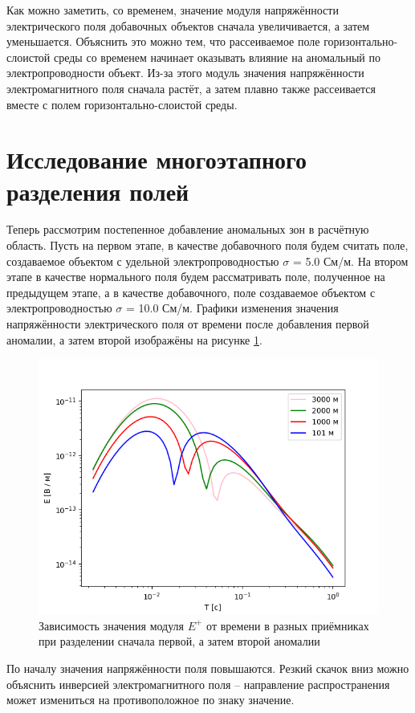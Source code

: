 Как можно заметить, со временем, значение модуля напряжённости электрического поля добавочных объектов сначала увеличивается, а затем уменьшается. Объяснить это можно тем, что рассеиваемое поле горизонтально-слоистой среды со временем начинает оказывать влияние на аномальный по электропроводности объект. Из-за этого модуль значения напряжённости электромагнитного поля сначала растёт, а затем плавно также рассеивается вместе с полем горизонтально-слоистой среды.

\section{Исследование многоэтапного разделения полей}

Теперь рассмотрим постепенное добавление аномальных зон в расчётную область. Пусть на первом этапе, в качестве добавочного поля будем считать поле, создаваемое объектом с удельной электропроводностью $\sigma$ = 5.0 См/м. На втором этапе в качестве нормального поля будем рассматривать поле, полученное на предыдущем этапе, а в качестве добавочного, поле создаваемое объектом с электропроводностью $\sigma$ = 10.0 См/м. Графики изменения значения напряжённости электрического поля от времени после добавления первой аномалии, а затем второй изображёны на рисунке \ref{fig:LogE_1_plus_2}.

\begin{figure}
	\centering
	\vspace*{0.7cm}
	\includegraphics[width=0.75\linewidth]{images/Log_E_1_plus_2.png}
	\caption{Зависимость значения модуля $E^+$ от времени в разных приёмниках при разделении сначала первой, а затем второй аномалии}
	\label{fig:LogE_1_plus_2}
\end{figure} 


По началу значения напряжённости поля повышаются. Резкий скачок вниз можно объяснить инверсией электромагнитного поля --  направление распространения может измениться на противоположное по знаку значение.

